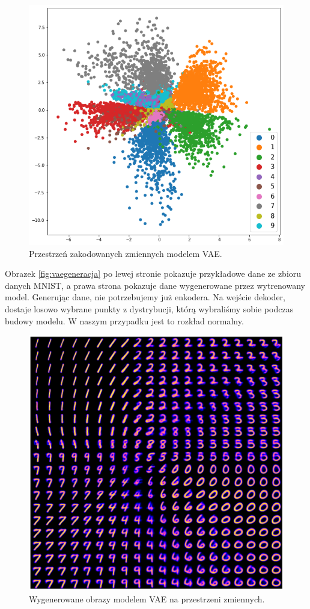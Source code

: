\documentclass[a4paper,12pt]{book} %
\begin{document}
\begin{figure}[h!]
	\centering
	\includegraphics[width=14cm]{vaelatentspace.png}
	\caption{Przestrzeń zakodowanych zmiennych modelem VAE.}
	\label{fig:vaelatent}
\end{figure}
Obrazek \ref{fig:vaegeneracja} po lewej stronie pokazuje przykładowe dane ze zbioru danych MNIST, a prawa strona pokazuje dane wygenerowane przez wytrenowany model. Generując dane, nie potrzebujemy już enkodera. Na wejście dekoder, dostaje losowo wybrane punkty z dystrybucji, którą wybraliśmy sobie podczas budowy modelu. W naszym przypadku jest to rozkład normalny.
\begin{figure}[h!]
	\centering
	\includegraphics[width=14cm]{vaelatentgen.png}
	\caption{Wygenerowane obrazy modelem VAE na przestrzeni zmiennych.}
	\label{fig:vaelatentgen}
\end{figure}
\end{document}
